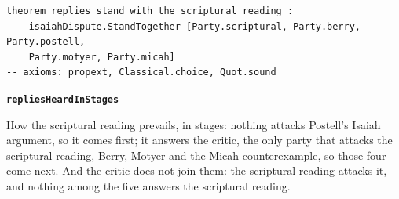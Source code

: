 \documentclass[11pt]{article}
\begin{document}
{\small\begin{verbatim}
theorem replies_stand_with_the_scriptural_reading :
    isaiahDispute.StandTogether [Party.scriptural, Party.berry, Party.postell,
    Party.motyer, Party.micah]
-- axioms: propext, Classical.choice, Quot.sound
\end{verbatim}}
\par\medskip\noindent\textbf{\texttt{replies\allowbreak{}Heard\allowbreak{}In\allowbreak{}Stages}}\par\nobreak\noindent
How the scriptural reading prevails, in stages: nothing attacks Postell’s Isaiah argument, so it comes first; it answers the critic, the only party that attacks the scriptural reading, Berry, Motyer and the Micah counterexample, so those four come next. And the critic does not join them: the scriptural reading attacks it, and nothing among the five answers the scriptural reading.
\end{document}
